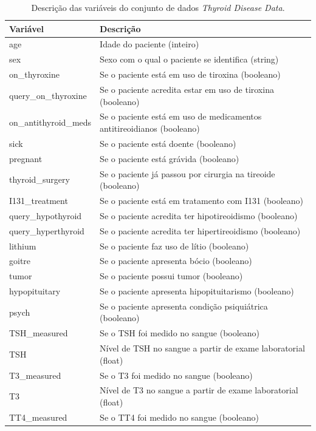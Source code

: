 \documentclass[11pt]{article}
\begin{document}
\begin{table}[H]
\centering
\caption{Descrição das variáveis do conjunto de dados \textit{Thyroid Disease Data}.}
\label{tab:features}
\begin{tabular}{|l|p{10cm}|}
\hline
\textbf{Variável} & \textbf{Descrição} \\ \hline
age & Idade do paciente (inteiro) \\ \hline
sex & Sexo com o qual o paciente se identifica (string) \\ \hline
on\_thyroxine & Se o paciente está em uso de tiroxina (booleano) \\ \hline
query\_on\_thyroxine & Se o paciente acredita estar em uso de tiroxina (booleano) \\ \hline
on\_antithyroid\_meds & Se o paciente está em uso de medicamentos antitireoidianos (booleano) \\ \hline
sick & Se o paciente está doente (booleano) \\ \hline
pregnant & Se o paciente está grávida (booleano) \\ \hline
thyroid\_surgery & Se o paciente já passou por cirurgia na tireoide (booleano) \\ \hline
I131\_treatment & Se o paciente está em tratamento com I131 (booleano) \\ \hline
query\_hypothyroid & Se o paciente acredita ter hipotireoidismo (booleano) \\ \hline
query\_hyperthyroid & Se o paciente acredita ter hipertireoidismo (booleano) \\ \hline
lithium & Se o paciente faz uso de lítio (booleano) \\ \hline
goitre & Se o paciente apresenta bócio (booleano) \\ \hline
tumor & Se o paciente possui tumor (booleano) \\ \hline
hypopituitary & Se o paciente apresenta hipopituitarismo (booleano) \\ \hline
psych & Se o paciente apresenta condição psiquiátrica (booleano) \\ \hline
TSH\_measured & Se o TSH foi medido no sangue (booleano) \\ \hline
TSH & Nível de TSH no sangue a partir de exame laboratorial (float) \\ \hline
T3\_measured & Se o T3 foi medido no sangue (booleano) \\ \hline
T3 & Nível de T3 no sangue a partir de exame laboratorial (float) \\ \hline
TT4\_measured & Se o TT4 foi medido no sangue (booleano) \\ \hline

\end{tabular}
\end{table}
\end{document}

